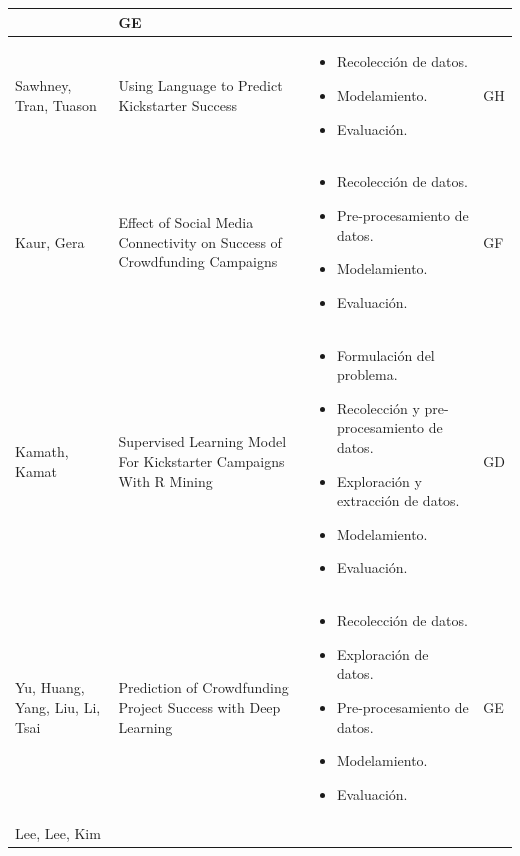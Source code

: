 \begin{longtable}{|M{3cm}|M{5.5cm}|M{5.5cm}|M{1.5cm}|}
\begin{itemize}[noitemsep,leftmargin=*]
			\end{itemize}
			& GE
			\\
			\hline
			Sawhney, Tran, Tuason
			& Using Language to Predict Kickstarter Success
			& 
			\begin{itemize}[noitemsep,leftmargin=*]
				\item Recolección de datos.
				\item Modelamiento.
				\item Evaluación.
			\end{itemize}
			& GH
			\\
			\hline
			Kaur, Gera
			& Effect of Social Media Connectivity on Success of Crowdfunding Campaigns
			& 
			\begin{itemize}[noitemsep,leftmargin=*]
				\item Recolección de datos.
				\item Pre-procesamiento de datos.
				\item Modelamiento.
				\item Evaluación.
			\end{itemize}
			& GF
			\\
			\hline
			Kamath, Kamat
			& Supervised Learning Model For Kickstarter Campaigns With R Mining
			& 
			\begin{itemize}[noitemsep,leftmargin=*]
				\item Formulación del problema.
				\item Recolección y pre-procesamiento de datos.
				\item Exploración y extracción de datos.
				\item Modelamiento.
				\item Evaluación.
			\end{itemize}
			& GD
			\\
			\hline
			Yu, Huang, Yang, Liu, Li, Tsai
			& Prediction of Crowdfunding Project Success with Deep Learning
			& 
			\begin{itemize}[noitemsep,leftmargin=*]
				\item Recolección de datos.
				\item Exploración de datos.
				\item Pre-procesamiento de datos.
				\item Modelamiento.
				\item Evaluación.
			\end{itemize}
			& GE
			\\
			\hline
			Lee, Lee, Kim

\end{longtable}
